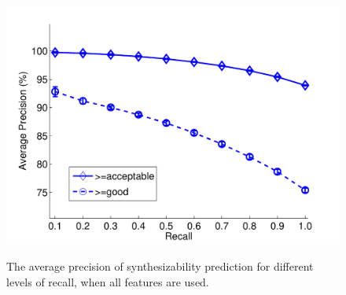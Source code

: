 \begin{figure} 
 \centering
\includegraphics[width=0.7\linewidth]{./forecasting/figs/AP_curve_all.pdf} \\ 
\caption{The average precision of synthesizability prediction for different levels of recall, when all features are used. }
  \label{fig:curve}
\end{figure}


